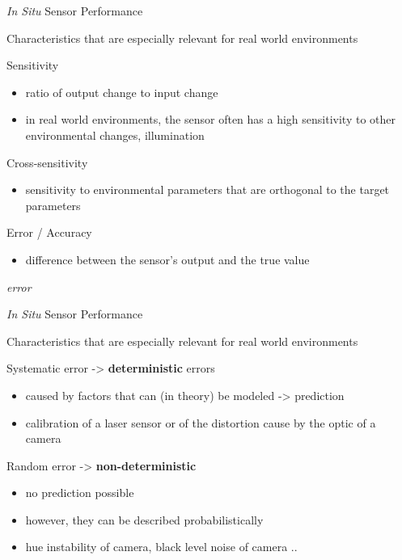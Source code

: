 \documentclass[compress]{beamer}
\providecommand{\tightlist}{%
  \setlength{\itemsep}{0pt}\setlength{\parskip}{0pt}}
\begin{document}
\begin{frame}{\emph{In Situ} Sensor Performance}

Characteristics that are especially relevant for real
world environments

Sensitivity

\begin{itemize}
\tightlist
\item
  ratio of output change to input change
\item
  in real world environments, the sensor often has a high sensitivity to
  other environmental changes, \eg illumination
\end{itemize}

Cross-sensitivity

\begin{itemize}
\tightlist
\item
  sensitivity to environmental parameters that are orthogonal to the
  target parameters
\end{itemize}

Error / Accuracy

\begin{itemize}
\tightlist
\item
  difference between the sensor's output and the true value
\end{itemize}

\emph{error}

\end{frame}

\begin{frame}{\emph{In Situ} Sensor Performance}

Characteristics that are especially relevant for real
world environments

Systematic error -\textgreater{} \textbf{deterministic} errors

\begin{itemize}
\tightlist
\item
  caused by factors that can (in theory) be modeled -\textgreater{}
  prediction
\item
  \eg calibration of a laser sensor or of the distortion cause by the
  optic of a camera
\end{itemize}

Random error -\textgreater{} \textbf{non-deterministic}

\begin{itemize}
\tightlist
\item
  no prediction possible
\item
  however, they can be described probabilistically
\item
  \eg hue instability of camera, black level noise of camera ..
\end{itemize}

\end{frame}
\end{document}
